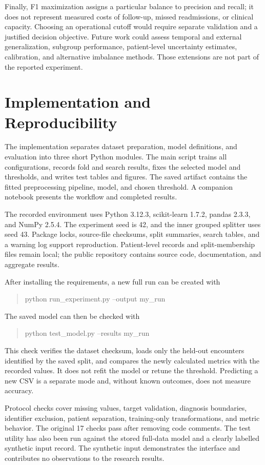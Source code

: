 \documentclass[conference]{IEEEtran}
\begin{document}
Finally, F1 maximization assigns a particular balance to precision and recall; it does not represent measured costs of follow-up, missed readmissions, or clinical capacity. Choosing an operational cutoff would require separate validation and a justified decision objective. Future work could assess temporal and external generalization, subgroup performance, patient-level uncertainty estimates, calibration, and alternative imbalance methods. Those extensions are not part of the reported experiment.

\section{Implementation and Reproducibility}
The implementation separates dataset preparation, model definitions, and evaluation into three short Python modules. The main script trains all configurations, records fold and search results, fixes the selected model and thresholds, and writes test tables and figures. The saved artifact contains the fitted preprocessing pipeline, model, and chosen threshold. A companion notebook presents the workflow and completed results.

The recorded environment uses Python 3.12.3, scikit-learn 1.7.2, pandas 2.3.3, and NumPy 2.5.4. The experiment seed is 42, and the inner grouped splitter uses seed 43. Package locks, source-file checksums, split summaries, search tables, and a warning log support reproduction. Patient-level records and split-membership files remain local; the public repository contains source code, documentation, and aggregate results.

After installing the requirements, a new full run can be created with
\begin{quote}
\small\ttfamily
python run\_experiment.py --output my\_run
\end{quote}
The saved model can then be checked with
\begin{quote}
\small\ttfamily
python test\_model.py --results my\_run
\end{quote}
This check verifies the dataset checksum, loads only the held-out encounters identified by the saved split, and compares the newly calculated metrics with the recorded values. It does not refit the model or retune the threshold. Predicting a new CSV is a separate mode and, without known outcomes, does not measure accuracy.

Protocol checks cover missing values, target validation, diagnosis boundaries, identifier exclusion, patient separation, training-only transformations, and metric behavior. The original 17 checks pass after removing code comments. The test utility has also been run against the stored full-data model and a clearly labelled synthetic input record. The synthetic input demonstrates the interface and contributes no observations to the research results.
\end{document}
